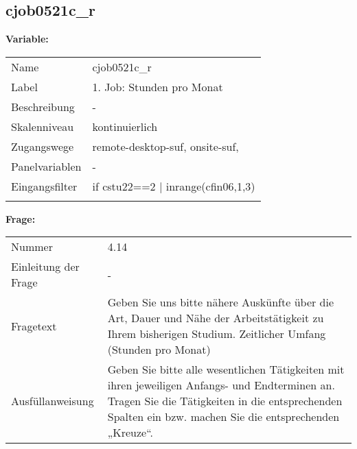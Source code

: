 	
	
	\subsection{cjob0521c\_r}
	\label{subSection:cjob0521c_r}

	\noindent\textbf{Variable:}\\
		\begin{tabular}{lL{11.3cm}}
			\label{tableVariable:cjob0521c_r}
			Name & cjob0521c\_r \\
			Label & 1. Job: Stunden pro Monat \\
			Beschreibung & - \\
			Skalenniveau & kontinuierlich \\
			Zugangswege &
				remote-desktop-suf,
				onsite-suf,
 \\
			Panelvariablen & -
			 \\
			Eingangsfilter & if cstu22==2 | inrange(cfin06,1,3) \\
 \\
		\end{tabular}

		\vspace*{1 cm}
		\noindent\textbf{Frage:}\\
		\begin{tabular}{lL{11.3cm}}
			\label{tableQuestion:cjob0521c_r}
			Nummer & 4.14 \\
			Einleitung der Frage & - \\
			Fragetext & Geben Sie uns bitte nähere Auskünfte über die Art, Dauer und Nähe der Arbeitstätigkeit zu Ihrem bisherigen Studium.
Zeitlicher Umfang
(Stunden pro Monat) \\
			Ausfüllanweisung & Geben Sie bitte alle wesentlichen Tätigkeiten mit ihren jeweiligen Anfangs- und Endterminen an. Tragen Sie die Tätigkeiten in die entsprechenden Spalten ein bzw. machen Sie die entsprechenden „Kreuze“. \\
		\end{tabular}




